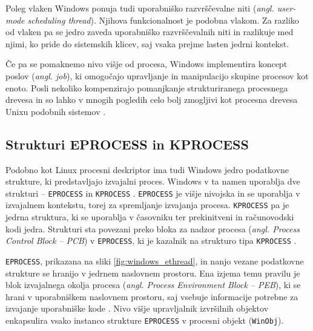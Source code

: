 \documentclass[a4paper,12pt,openright]{book}
\begin{document}
Poleg vlaken Windows ponuja tudi uporabniško razvrščevalne niti (\textit{angl. user-mode scheduling thread}).
Njihova funkcionalnost je podobna vlakom.
Za razliko od vlaken pa se jedro zaveda uporabniško razvrščevalnih niti in razlikuje med njimi, ko pride do sistemskih klicev, saj vsaka prejme lasten jedrni kontekst.

Če pa se pomaknemo nivo višje od procesa, Windows implementira koncept poslov (\textit{angl. job}), ki omogočajo upravljanje in manipulacijo skupine procesov kot enoto.
Posli nekoliko kompenzirajo pomanjkanje strukturiranega procesnega drevesa in so lahko v mnogih pogledih celo bolj zmogljivi kot procesna drevesa Unixu podobnih sistemov \cite{Yosifovich_Russinovich_Solomon_Ionescu_2017}.

\subsection{Strukturi EPROCESS in KPROCESS} \label{ssec:windows_process:eprocess}

Podobno kot Linux procesni deskriptor ima tudi Windows jedro podatkovne strukture, ki predstavljajo izvajalni proces.
Windows v ta namen uporablja dve strukturi -- \texttt{EPROCESS} in \texttt{KPROCESS} \cite{Yosifovich_Russinovich_Solomon_Ionescu_2017}.
\texttt{EPROCESS} je višje nivojska in se uporablja v izvajalnem kontekstu, torej za spremljanje izvajanja procesa.
\texttt{KPROCESS} pa je jedrna struktura, ki se uporablja v časovniku ter prekinitveni in računovodski kodi jedra.
Strukturi sta povezani preko bloka za nadzor procesa (\textit{angl. Process Control Block -- PCB}) v \texttt{EPROCESS}, ki je kazalnik na strukturo tipa \texttt{KPROCESS} \cite{Yosifovich_Russinovich_Solomon_Ionescu_2017}.

\texttt{EPROCESS}, prikazana na sliki \ref{fig:windows_ethread}, in nanjo vezane podatkovne strukture se hranijo v jedrnem naslovnem prostoru.
Ena izjema temu pravilu je blok izvajalnega okolja procesa (\textit{angl. Process Environment Block -- PEB}), ki se hrani v uporabniškem naslovnem prostoru, saj vsebuje informacije potrebne za izvajanje uporabniške kode \cite{Yosifovich_Russinovich_Solomon_Ionescu_2017}.
Nivo višje upravljalnik izvršilnih objektov enkapsulira vsako instanco strukture \texttt{EPROCESS} v procesni objekt (\texttt{WinObj}).
\end{document}
